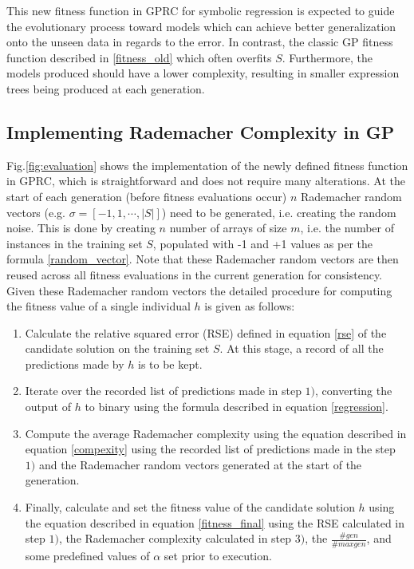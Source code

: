 \documentclass[conference]{IEEEtran}
\begin{document}
This new fitness function in GPRC for symbolic regression is expected to guide the evolutionary process toward models which can achieve better generalization onto the unseen data in regards to the error. In contrast, the classic GP fitness function described in \eqref{fitness_old} which often overfits $S$. Furthermore, the models produced should have a lower complexity, resulting in smaller expression trees being produced at each generation.

\subsection{Implementing Rademacher Complexity in GP}

Fig.\ref{fig:evaluation} shows the implementation of the newly defined fitness function in GPRC, which is straightforward and does not require many alterations. At the start of each generation (before fitness evaluations occur) $n$ Rademacher random vectors (e.g. $\sigma = [-1, 1, \cdots, |S|]$) need to be generated, i.e. creating the random noise. This is done by creating $n$ number of arrays of size $m$, i.e. the number of instances in the training set $S$, populated with -1 and +1 values as per the formula \eqref{random_vector}. Note that these Rademacher random vectors are then reused across all fitness evaluations in the current generation for consistency. Given these Rademacher random vectors the detailed procedure for computing the fitness value of a single individual $h$ is given as follows:

\begin{enumerate}

  \item Calculate the relative squared error (RSE) defined in equation \eqref{rse} of the candidate solution on the training set $S$. At this stage, a record of all the predictions made by $h$ is to be kept.
  
  \item Iterate over the recorded list of predictions made in step $1)$, converting the output of $h$ to binary using the formula described in equation \eqref{regression}.
  
  \item Compute the average Rademacher complexity using the equation described in equation \eqref{compexity} using the recorded list of predictions made in the step $1)$ and the Rademacher random vectors generated at the start of the generation.
   
  \item Finally, calculate and set the fitness value of the candidate solution $h$ using the equation described in equation \eqref{fitness_final} using the RSE calculated in step $1)$, the Rademacher complexity calculated in step $3)$, the $\frac{\#gen}{\#max gen}$, and some predefined values of $\alpha$ set prior to execution.
  
\end{enumerate}
\end{document}
